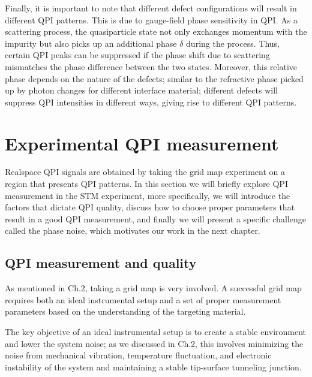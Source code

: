 Finally, it is important to note that different defect configurations will result in different \ac{QPI} patterns. This is due to gauge-field phase sensitivity in \ac{QPI}. As a scattering process, the quasiparticle state not only exchanges momentum with the impurity but also picks up an additional phase $\delta$ during the process. Thus, certain QPI peaks can be suppressed if the phase shift due to scattering mismatches the phase difference between the two states. Moreover, this relative phase depends on the nature of the defects; similar to the refractive phase picked up by photon changes for different interface material; different defects will suppress \ac{QPI} intensities in different ways, giving rise to different \ac{QPI} patterns. 




\section{Experimental QPI measurement}
Realspace \ac{QPI} signals are obtained by taking the grid map experiment on a region that presents \ac{QPI} patterns. In this section we will briefly explore \ac{QPI} measurement in the \ac{STM} experiment, more specifically, we will introduce the factors that dictate \ac{QPI} quality, discuss how to choose proper parameters that result in a good \ac{QPI} measurement, and finally we will present a specific challenge called the phase noise, which motivates our work in the next chapter.


\subsection{QPI measurement and quality}
As mentioned in Ch.2, taking a grid map is very involved. A successful grid map requires both an ideal instrumental setup and a set of proper measurement parameters based on the understanding of the targeting material. 

The key objective of an ideal instrumental setup is to create a stable environment and lower the system noise; as we discussed in Ch.2, this involves minimizing the noise from mechanical vibration, temperature fluctuation, and electronic instability of the system and maintaining a stable tip-surface tunneling junction. 

